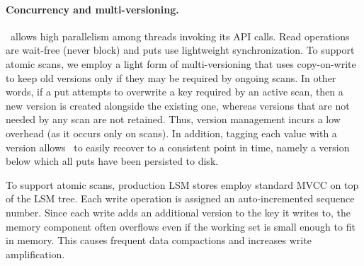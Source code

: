 
 \paragraph{Concurrency and multi-versioning.}
 \sys\ allows high parallelism among threads invoking its API calls. 
 Read operations are wait-free (never block) and puts use lightweight synchronization. 
 To support atomic scans, we  employ a light form of multi-versioning that uses 
copy-on-write to keep old versions only if they may be required by ongoing scans. 
In other words, if a put attempts to overwrite a key required by an active scan, then a new version is created alongside the 
existing one, whereas versions that are not needed by any scan are not retained. 
Thus, version management incurs a low overhead (as it occurs only on scans). 
In addition, tagging each value with a version allows \sys\ to easily recover to a consistent point in time, namely a version below which all puts have been persisted to disk.

To support atomic scans, production LSM stores employ standard MVCC on top of the LSM tree.  
Each write operation is assigned an auto-incremented sequence number. Since each write adds an additional version to the key it writes to, the memory component often overflows  even if the working set is small enough to fit in memory. This causes frequent data compactions and increases write amplification.


